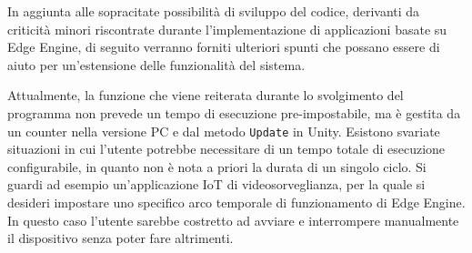 In aggiunta alle sopracitate possibilità di sviluppo del codice, derivanti da criticità minori riscontrate durante l’implementazione di applicazioni basate su Edge Engine, di seguito verranno forniti ulteriori spunti che possano essere di aiuto per un’estensione delle funzionalità del sistema.

Attualmente, la funzione che viene reiterata durante lo svolgimento del programma non prevede un tempo di esecuzione pre-impostabile, ma è gestita da un counter nella versione PC e dal metodo \texttt{Update} in Unity. Esistono svariate situazioni in cui l’utente potrebbe necessitare di un tempo totale di esecuzione configurabile, in quanto non è nota a priori la durata di un singolo ciclo. Si guardi ad esempio un’applicazione IoT di videosorveglianza, per la quale si desideri impostare uno specifico arco temporale di funzionamento di Edge Engine. In questo caso l’utente sarebbe costretto ad avviare e interrompere manualmente il dispositivo senza poter fare altrimenti.